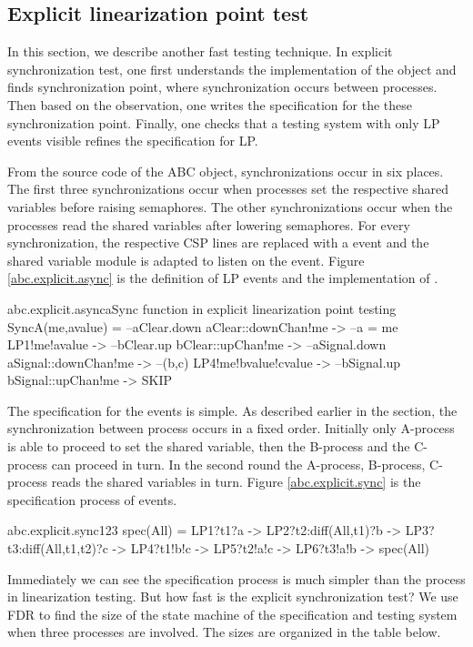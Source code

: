 \documentclass[a4paper, 12pt]{article}
\begin{document}
\subsection{Explicit linearization point test}
In this section, we describe another fast testing technique. In explicit synchronization test, one first understands the implementation of the object and finds synchronization point, where synchronization occurs between processes. Then based on the observation, one writes the specification for the these synchronization point. Finally, one checks that a testing system with only LP events visible refines the specification for LP.

From the source code of the ABC object, synchronizations occur in six places. The first three synchronizations occur when processes set the respective shared variables before raising semaphores. The other synchronizations occur when the processes read the shared variables after lowering semaphores. For every synchronization, the respective CSP lines are replaced with a  event and the shared variable module is adapted to listen on the  event. Figure \ref{abc.explicit.async} is the definition of LP events and the implementation of . 
\begin{cspfloat}{abc.explicit.async}{aSync function in explicit linearization point testing}
SyncA(me,avalue) =
  --aClear.down
  aClear::downChan!me ->
  --a = me
  LP1!me!avalue ->
  --bClear.up
  bClear::upChan!me ->
  --aSignal.down
  aSignal::downChan!me ->
  --(b,c)
  LP4!me!bvalue!cvalue ->
  --bSignal.up
  bSignal::upChan!me ->
  SKIP
\end{cspfloat}

The specification for the  events is simple. As described earlier in the section, the synchronization between process occurs in a fixed order. Initially only A-process is able to proceed to set the shared variable, then the B-process and the C-process can proceed in turn. In the second round the A-process, B-process, C-process reads the shared variables in turn. Figure \ref{abc.explicit.sync} is the specification process of  events. 

\begin{cspfloat}{abc.explicit.sync}{123}
spec(All) = 
  LP1?t1?a ->
  LP2?t2:diff(All,{t1})?b ->
  LP3?t3:diff(All,{t1,t2})?c ->
  LP4?t1!b!c ->
  LP5?t2!a!c ->
  LP6?t3!a!b ->
  spec(All)
\end{cspfloat}

Immediately we can see the specification process is much simpler than the process in linearization testing. But how fast is the explicit synchronization test? We use FDR to find the size of the state machine of the specification and testing system when three processes are involved. The sizes are organized in the table below. 
\end{document}
